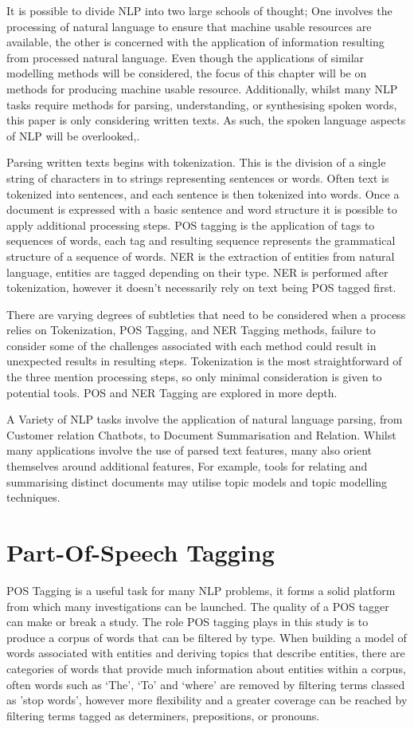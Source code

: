 \documentclass[10pt]{report}
\begin{document}
It is possible to divide NLP into two large schools of thought; One involves the processing of natural language to ensure that machine usable resources are available, the other is concerned with the application of information resulting from processed natural language. Even though the applications of similar modelling methods will be considered, the focus of this chapter will be on methods for producing machine usable resource. Additionally, whilst many NLP tasks require methods for parsing, understanding, or synthesising spoken words, this paper is only considering written texts. As such, the spoken language aspects of NLP will be overlooked,.

Parsing written texts begins with tokenization. This is the division of a single string of characters in to strings representing sentences or words. Often text is tokenized into sentences, and each sentence is then tokenized into words. Once a document is expressed with a basic sentence and word structure it is possible to apply additional processing steps. POS tagging is the application of tags to sequences of words, each tag and resulting sequence represents the grammatical structure of a sequence of words. NER is the extraction of entities from natural language, entities are tagged depending on their type. NER is performed after tokenization, however it doesn’t necessarily rely on text being POS tagged first.

There are varying degrees of subtleties that need to be considered when a process relies on Tokenization, POS Tagging, and NER Tagging methods, failure to consider some of the challenges associated with each method could result in unexpected results in resulting steps. Tokenization is the most straightforward of the three mention processing steps, so only minimal consideration is given to potential tools. POS and NER Tagging are explored in more depth.

A Variety of NLP tasks involve the application of natural language parsing, from Customer relation Chatbots, to Document Summarisation and Relation. Whilst many applications involve the use of parsed text features, many also orient themselves around additional features, For example, tools for relating and summarising distinct documents may utilise topic models and topic modelling techniques.


\section{Part-Of-Speech Tagging}
POS Tagging is a useful task for many NLP problems, it forms a solid platform from which many investigations can be launched. The quality of a POS tagger can make or break a study. The role POS tagging plays in this study is to produce a corpus of words that can be filtered by type. When building a model of words associated with entities and deriving topics that describe entities, there are categories of words that provide much information about entities within a corpus, often words such as ‘The’, ‘To’ and ‘where’ are removed by filtering terms classed as 'stop words', however more flexibility and a greater coverage can be reached by filtering terms tagged as determiners, prepositions, or pronouns.
\end{document}
